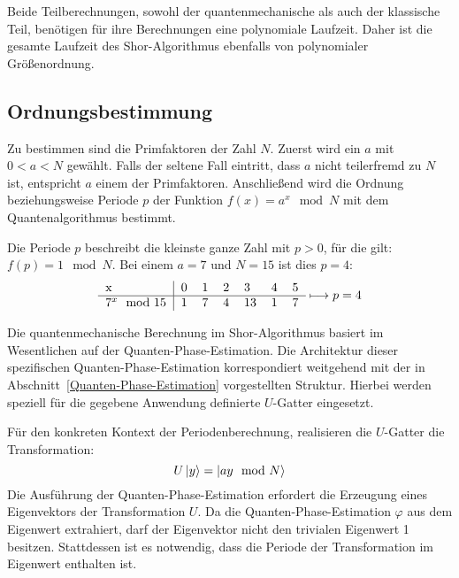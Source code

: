 Beide Teilberechnungen, sowohl der quantenmechanische als auch der klassische Teil, 
benötigen für ihre Berechnungen eine polynomiale Laufzeit. 
Daher ist die gesamte Laufzeit des Shor-Algorithmus ebenfalls von polynomialer Größenordnung.

\subsection{Ordnungsbestimmung} \label{Shor:Ordnungsbestimmung}
Zu bestimmen sind die Primfaktoren der Zahl \(N\).
Zuerst wird ein \(a\) mit \(0 < a < N\) gewählt.
Falls der seltene Fall eintritt, dass \(a\) nicht teilerfremd zu \(N\) ist, entspricht \(a\) einem der Primfaktoren.
Anschließend wird die Ordnung beziehungsweise Periode \(p\) der Funktion \({f(x) = a^x \mod N}\) mit dem Quantenalgorithmus bestimmt.

Die Periode \(p\) beschreibt die kleinste ganze Zahl mit \({p > 0}\), für die gilt: \({f(p) = 1 \mod N}\).
Bei einem \(a = 7\) und \(N = 15\) ist dies \(p=4\):
\[
\begin{tabular}{l|llllll}
    x     &     0     &     1       &     2      &      3   &  4 &  5  \\ \hline
    \(7^x \mod 15\)    &      1     &        7     &       4     &     13     &  1 &  7 
\end{tabular} \longmapsto p = 4
\]

Die quantenmechanische Berechnung im Shor-Algorithmus basiert im Wesentlichen auf der Quanten-Phase-Estimation.
Die Architektur dieser spezifischen Quanten-Phase-Estimation korrespondiert weitgehend mit der in Abschnitt~\ref{Quanten-Phase-Estimation} vorgestellten Struktur.
Hierbei werden speziell für die gegebene Anwendung definierte \(U\)-Gatter eingesetzt.

Für den konkreten Kontext der Periodenberechnung, realisieren die \(U\)-Gatter die Transformation:
\[U\ket{y} = \ket{ay \mod N}\] 
Die Ausführung der Quanten-Phase-Estimation erfordert die Erzeugung eines Eigenvektors der Transformation \(U\).
Da die Quanten-Phase-Estimation \(\varphi\) aus dem Eigenwert extrahiert, 
darf der Eigenvektor nicht den trivialen Eigenwert 1 besitzen.
Stattdessen ist es notwendig, dass die Periode der Transformation im Eigenwert enthalten ist.

